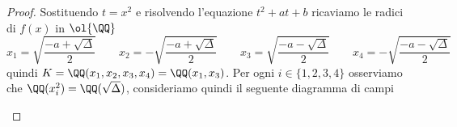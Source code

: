 \documentclass[11pt]{scrartcl}
\begin{document}
	\begin{proof}
		Sostituendo $t = x^2$ e risolvendo l'equazione $t^2 + at + b$ ricaviamo
		le radici di $f(x)$ in $\ol{\QQ}$
		\[
		x_1 = \sqrt{\frac{-a + \sqrt{\Delta}}{2}}\qquad 
		x_2 = -\sqrt{\frac{-a + \sqrt{\Delta}}{2}}\qquad
		x_3 = \sqrt{\frac{-a - \sqrt{\Delta}}{2}}\qquad
		x_4 = -\sqrt{\frac{-a - \sqrt{\Delta}}{2}}
		\]
		quindi $K = \QQ(x_1, x_2, x_3, x_4) = \QQ(x_1, x_3)$. Per ogni $i \in
		\{1, 2, 3, 4\}$ osserviamo che $\QQ(x_i^2) = \QQ(\sqrt{\Delta})$,
		consideriamo quindi il seguente diagramma di campi 
		\begin{center}
\end{center}
\end{proof}
\end{document}
